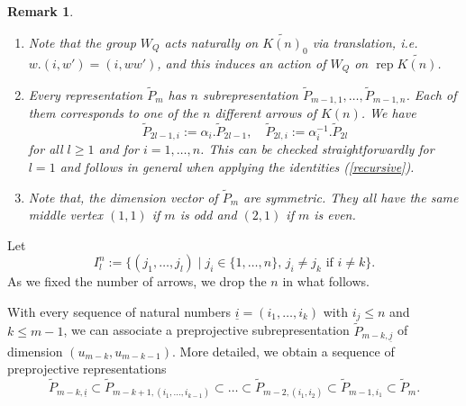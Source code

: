 \documentclass{amsart}
\newtheorem{remark}[theorem]{Remark}
\newcommand{\ui}{\underline i}
\newcommand{\uj}{\underline j}
\newcommand{\rep}{\operatorname{rep}}
\begin{document}
\begin{remark}
  \mbox{}
  \begin{enumerate}
    \item Note that the group $W_Q$ acts naturally on $\widetilde{K(n)}_0$ via translation, i.e. $w.(i,w')=(i,ww')$, and this induces an action of $W_Q$ on $\rep\widetilde{K(n)}$. 
    \item  Every representation $\tilde P_m$ has $n$ subrepresentation $\tilde P_{m-1,1},\ldots,\tilde P_{m-1,n}$. Each of them corresponds to one of the $n$ different arrows of $K(n)$. 	
		We have 
      $$\tilde P_{2l-1,i}:=\alpha_i.\tilde P_{2l-1},\quad \tilde P_{2l,i}:=\alpha_i^{-1}.\tilde P_{2l}$$
      for all $l\geq 1$ and for $i=1,\ldots,n$. This can be checked straightforwardly for $l=1$ and follows in general when applying the identities (\ref{recursive}). 

     
    \item Note that, the dimension vector of $\tilde P_m$ are symmetric. They all have the same middle vertex $(1,1)$ if $m$ is odd and $(2,1)$ if $m$ is even.
\end{enumerate}
\end{remark}
Let
$$I^n_l:=\{(j_1,\ldots,j_{l})\mid j_i\in\{1,\ldots,n\},\,j_i\neq j_k\text{ if }i\neq k\}.$$
As we fixed the number of arrows, we drop the $n$ in what follows. 

With every sequence of natural numbers $\ui=(i_1,\ldots,i_k)$ with $i_j\leq n$ and $k\leq m-1$, we can associate a preprojective subrepresentation $\tilde P_{m-k,\uj}$ of dimension $(u_{m-k},u_{m-k-1})$. More detailed, we obtain a sequence of preprojective representations 
$$\tilde P_{m-k,\ui}\subset \tilde P_{m-k+1,(i_1,\ldots,i_{k-1})}\subset\ldots\subset \tilde P_{m-2,(i_1,i_2)}\subset \tilde P_{m-1,i_1}\subset\tilde P_{m}.$$
\end{document}
